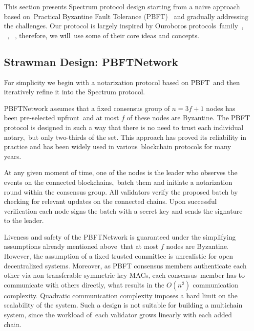 This section presents Spectrum protocol design starting from a naive approach based on\
Practical Byzantine Fault Tolerance (PBFT)~\cite{Castro2001} and gradually addressing the challenges.
Our protocol is largely inspired by Ouroboros protocols\
family~\cite{cryptoeprint:2017/573}, ~\cite{Badertscher2018}, ~\cite{cryptoeprint:2019/838}, therefore, we will\
use some of their core ideas and concepts.

\subsection{Strawman Design: PBFTNetwork}\label{subsec:strawman-design}

For simplicity we begin with a notarization protocol based on PBFT\
and then iteratively refine it into the Spectrum protocol.

PBFTNetwork assumes that a fixed consensus group of ${n = 3f + 1}$ nodes has been pre-selected upfront\
and at most $f$ of these nodes are Byzantine.
The PBFT protocol is designed in such a way that there is no need to trust each individual notary,\
but only two-thirds of the set.
This approach has proved its reliability in practice and has been widely used in various\
blockchain protocols for many years.

At any given moment of time, one of the nodes is the leader who observes the events on the connected blockchains,\
batch them and initiate a notarization round within the consensus group.
All validators verify the proposed batch by checking for relevant updates on the connected chains.
Upon successful verification each node signs the batch with a secret key and sends the signature to the leader.

Liveness and safety of the PBFTNetwork is guaranteed under the simplifying assumptions already mentioned above\
that at most $f$ nodes are Byzantine.
However, the assumption of a fixed trusted committee is unrealistic for open decentralized systems.
Moreover, as PBFT consensus members authenticate each other via non-transferable symmetric-key MACs, each consensus\
member has to communicate with others directly, what results in the $O(n^2)$ communication complexity.
Quadratic communication complexity imposes a hard limit on the scalability of the system.
Such a design is not suitable for building a multichain system, since the workload of\
each validator grows linearly with each added chain.

